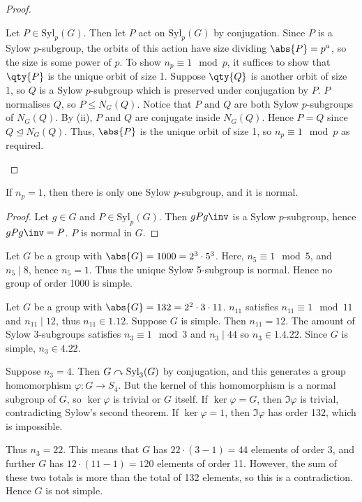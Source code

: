 \begin{proof}
\begin{enumerate}
		      Let $P \in \mathrm{Syl}_p(G)$.
		      Then let $P$ act on $\mathrm{Syl}_p(G)$ by conjugation.
		      Since $P$ is a Sylow $p$-subgroup, the orbits of this action have size dividing $\abs{P} = p^a$, so the size is some power of $p$.
		      To show $n_p \equiv 1 \mod p$, it suffices to show that $\qty{P}$ is the unique orbit of size 1.
		      Suppose $\qty{Q}$ is another orbit of size 1, so $Q$ is a Sylow $p$-subgroup which is preserved under conjugation by $P$.
		      $P$ normalises $Q$, so $P \leq N_G(Q)$.
		      Notice that $P$ and $Q$ are both Sylow $p$-subgroups of $N_G(Q)$.
		      By (ii), $P$ and $Q$ are conjugate inside $N_G(Q)$.
		      Hence $P = Q$ since $Q \trianglelefteq N_G(Q)$.
		      Thus, $\abs{P}$ is the unique orbit of size 1, so $n_p \equiv 1 \mod p$ as required.
	\end{enumerate}
\end{proof}
\begin{corollary}
	If $n_p = 1$, then there is only one Sylow $p$-subgroup, and it is normal.
\end{corollary}
\begin{proof}
	Let $g \in G$ and $P \in \mathrm{Syl}_p(G)$.
	Then $g P g\inv$ is a Sylow $p$-subgroup, hence $g P g\inv = P$.
	$P$ is normal in $G$.
\end{proof}
\begin{example}
	Let $G$ be a group with $\abs{G} = 1000 = 2^3 \cdot 5^3$.
	Here, $n_5 \equiv 1 \mod 5$, and $n_5 \mid 8$, hence $n_5 = 1$.
	Thus the unique Sylow 5-subgroup is normal.
	Hence no group of order 1000 is simple.
\end{example}
\begin{example}
	Let $G$ be a group with $\abs{G} = 132 = 2^2 \cdot 3 \cdot 11$.
	$n_{11}$ satisfies $n_{11} \equiv 1 \mod 11$ and $n_{11} \mid 12$, thus $n_{11} \in \qty{1, 12}$.
	Suppose $G$ is simple.
	Then $n_{11} = 12$.
	The amount of Sylow 3-subgroups satisfies $n_3 \equiv 1 \mod 3$ and $n_3 \mid 44$ so $n_3 \in \qty{1, 4, 22}$.
	Since $G$ is simple, $n_3 \in \qty{4, 22}$.

	Suppose $n_3 = 4$.
	Then $G \curvearrowright \mathrm{Syl}_3(G)$ by conjugation, and this generates a group homomorphism $\varphi \colon G \to S_4$.
	But the kernel of this homomorphism is a normal subgroup of $G$, so $\ker \varphi$ is trivial or $G$ itself.
	If $\ker \varphi = G$, then $\Im \varphi$ is trivial, contradicting Sylow's second theorem.
	If $\ker \varphi = 1$, then $\Im \varphi$ has order 132, which is impossible.

	Thus $n_3 = 22$.
	This means that $G$ has $22 \cdot (3-1) = 44$ elements of order 3, and further $G$ has $12 \cdot (11 - 1) = 120$ elements of order 11.
	However, the sum of these two totals is more than the total of 132 elements, so this is a contradiction.
	Hence $G$ is not simple.
\end{example}
